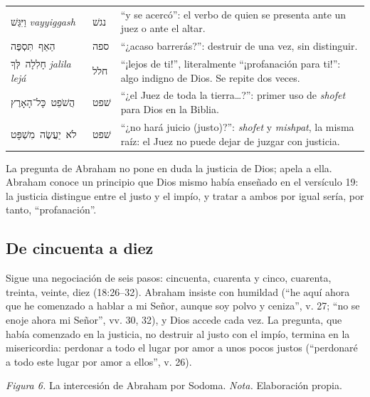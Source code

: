 \documentclass[11pt,letterpaper]{article}
\newcommand{\heb}[1]{\mbox{\foreignlanguage{hebrew}{#1}}}
\begin{document}
\begin{filologia}[Gn 18:23--25]
\begin{tabular}{@{}L{3.2cm}L{1.6cm}L{10cm}@{}}
\heb{וַיִּגַּשׁ} \emph{vayyiggash} & \heb{נגשׁ} & ``y se acercó'': el verbo de quien se presenta ante un juez o ante el altar. \\[2pt]
\heb{הַאַף תִּסְפֶּה} & \heb{ספה} & ``¿acaso barrerás?'': destruir de una vez, sin distinguir. \\[2pt]
\heb{חָלִלָה לְּךָ} \emph{jalila lejá} & \heb{חלל} & ``¡lejos de ti!'', literalmente ``¡profanación para ti!'': algo indigno de Dios. Se repite dos veces. \\[2pt]
\heb{הֲשֹׁפֵט כָּל־הָאָרֶץ} & \heb{שׁפט} & ``¿el Juez de toda la tierra\ldots?'': primer uso de \emph{shofet} para Dios en la Biblia. \\[2pt]
\heb{לֹא יַעֲשֶׂה מִשְׁפָּט} & \heb{שׁפט} & ``¿no hará juicio (justo)?'': \emph{shofet} y \emph{mishpat}, la misma raíz: el Juez no puede dejar de juzgar con justicia. \\
\end{tabular}
\end{filologia}

La pregunta de Abraham no pone en duda la justicia de Dios; apela a ella. Abraham conoce un principio que Dios mismo había enseñado en el versículo 19: la justicia distingue entre el justo y el impío, y tratar a ambos por igual sería, por tanto, ``profanación''.

\subsection{De cincuenta a diez}
Sigue una negociación de seis pasos: cincuenta, cuarenta y cinco, cuarenta, treinta, veinte, diez (18:26--32). Abraham insiste con humildad (``he aquí ahora que he comenzado a hablar a mi Señor, aunque soy polvo y ceniza'', v. 27; ``no se enoje ahora mi Señor'', vv. 30, 32), y Dios accede cada vez. La pregunta, que había comenzado en la justicia, no destruir al justo con el impío, termina en la misericordia: perdonar a todo el lugar por amor a unos pocos justos (``perdonaré a todo este lugar por amor a ellos'', v. 26).

\begin{center}
\par
{\footnotesize\color{gris}\textit{Figura 6.} La intercesión de Abraham por Sodoma. \textit{Nota.} Elaboración propia.}
\end{center}
\end{document}
